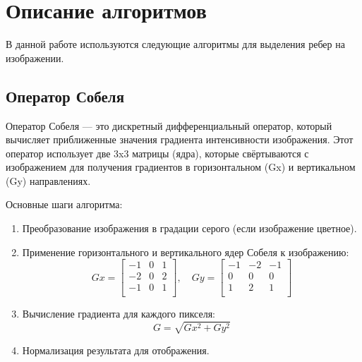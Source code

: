 \documentclass[]{article}
\theoremstyle{remark}
\theoremstyle{definition}
\begin{document}
\newpage

\section{Описание алгоритмов}

\par В данной работе используются следующие алгоритмы для выделения ребер на изображении.

\subsection{Оператор Собеля}

\par Оператор Собеля — это дискретный дифференциальный оператор, который вычисляет приближенные значения градиента интенсивности изображения. Этот оператор использует две 3x3 матрицы (ядра), которые свёртываются с изображением для получения градиентов в горизонтальном (Gx) и вертикальном (Gy) направлениях.

\par Основные шаги алгоритма:

\begin{enumerate}
    \item Преобразование изображения в градации серого (если изображение цветное).
    \item Применение горизонтального и вертикального ядер Собеля к изображению:
    \begin{equation}
    Gx = \begin{bmatrix}
    -1 & 0 & 1 \\
    -2 & 0 & 2 \\
    -1 & 0 & 1 \\
    \end{bmatrix}, \quad
    Gy = \begin{bmatrix}
    -1 & -2 & -1 \\
    0 & 0 & 0 \\
    1 & 2 & 1 \\
    \end{bmatrix}
    \end{equation}
    \item Вычисление градиента для каждого пикселя:
    \begin{equation}
    G = \sqrt{Gx^2 + Gy^2}
    \end{equation}
    \item Нормализация результата для отображения.
\end{enumerate}
\end{document}
